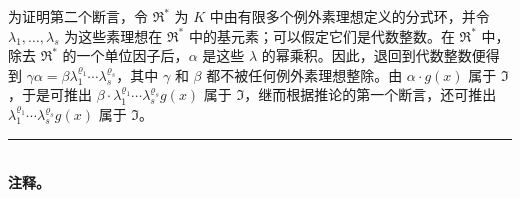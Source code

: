 为证明第二个断言，令 $\mathfrak{R}^*$ 为 $K$ 中由有限多个例外素理想定义的分式环，并令 $\lambda_1,\ldots,\lambda_s$ 为这些素理想在 $\mathfrak{R}^*$ 中的基元素；可以假定它们是代数整数。在 $\mathfrak{R}^*$ 中，除去 $\mathfrak{R}^*$ 的一个单位因子后，$\alpha$ 是这些 $\lambda$ 的幂乘积。因此，退回到代数整数便得到 $\gamma\alpha = \beta \lambda_1^{\varrho_1} \cdots \lambda_s^{\varrho_s}$，其中 $\gamma$ 和 $\beta$ 都不被任何例外素理想整除。由 $\alpha \cdot g(x)$ 属于 $\mathfrak{I}$，于是可推出 $\beta \cdot \lambda_1^{\varrho_1} \cdots \lambda_s^{\varrho_s} g(x)$ 属于 $\mathfrak{I}$，继而根据推论的第一个断言，还可推出 $\lambda_1^{\varrho_1} \cdots \lambda_s^{\varrho_s} g(x)$ 属于 $\mathfrak{I}$。

\begin{center}
\rule{4cm}{0.4pt}\\[0.6em]
\textbf{注释。}
\end{center}

